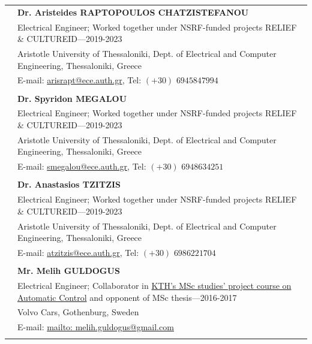 \documentclass[a4paper,10pt,twoside]{article}
\begin{document}
\begin{tabular}{rp{14cm}}
& \textbf{Dr. Aristeides RAPTOPOULOS CHATZISTEFANOU} \\
& {Electrical Engineer; Worked together under NSRF-funded projects RELIEF \& CULTUREID}---2019-2023\\
&Aristotle University of Thessaloniki, Dept. of Electrical and Computer Engineering, Thessaloniki, Greece \\
& E-mail: \href{mailto: arisrapt@ece.auth.gr}{arisrapt@ece.auth.gr}, Tel: $(+30)$ $694 584 7994$ \\
&\\
& \textbf{Dr. Spyridon MEGALOU} \\
& {Electrical Engineer; Worked together under NSRF-funded projects RELIEF \& CULTUREID}---2019-2023\\
&Aristotle University of Thessaloniki, Dept. of Electrical and Computer Engineering, Thessaloniki, Greece \\
& E-mail: \href{mailto: smegalou@ece.auth.gr}{smegalou@ece.auth.gr}, Tel: $(+30)$ $694 863 4251$ \\
&\\
& \textbf{Dr. Anastasios TZITZIS} \\
& {Electrical Engineer; Worked together under NSRF-funded projects RELIEF \& CULTUREID}---2019-2023\\
&Aristotle University of Thessaloniki, Dept. of Electrical and Computer Engineering, Thessaloniki, Greece \\
& E-mail: \href{mailto: atzitzis@ece.auth.gr}{atzitzis@ece.auth.gr}, Tel: $(+30)$ $698 622 1704$ \\
&\\
& \textbf{Mr. Melih GULDOGUS} \\
& {Electrical Engineer; Collaborator in \href{https://www.kth.se/student/kurser/kurs/EL2421?startterm=20162\&l=en}{KTH's MSc studies' project course on Automatic Control} and opponent of MSc thesis}---2016-2017\\
& Volvo Cars, Gothenburg, Sweden \\
& E-mail: \href{mailto: melih.guldogus@gmail.com}{mailto: melih.guldogus@gmail.com} \\
&\\
\end{tabular}
\end{document}
